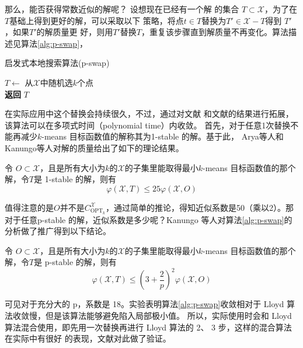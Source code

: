 那么，能否获得常数近似的解呢？ 设想现在已经有一个解
的集合 $T \subset \mathcal{X}$，为了在$T$基础上得到更好的解，可以采取以下
策略，将点$t\in T$替换为$T' \in \mathcal{X}-T$得到 $T'$，如果$T'$的解质量更
好，则用$T'$替换$T$，重复该步骤直到解质量不再变化。算法描
述见算法\ref{alg:p-swap}，
\begin{algorithm}
    \caption{启发式本地搜索算法(p-swap)}\label{alg:p-swap}
    $T \gets $ 从$\mathcal{X}$中随机选$k$个点 \\
    \textbf{返回} $T$
\end{algorithm}
在实际应用中这个替换会持续很久，不过，通过对文献
\cite{arya2004local}和文献\cite{charikar1999improved}的结果进行拓展，该算法可以在多项式时间（polynomial time）内收敛。 首先，对于任意1次替换不能再减少$k$-means 目标函数值的解称其为1-stable 的解。基于此， Arya等人和Kanungo等人对解的质量给出了如下的理论结果。
\begin{theorem}[1-stable的解的质量]
    令 $O \subset \mathcal{X}$，且是所有大小为$k$的$\mathcal{X}$的子集里能取得最小$k$-means 目标函数值的那个解，令$T$是 1-stable 的解，则有
    \begin{equation}
        \varphi(\mathcal{X},T) \leq 25 \varphi(\mathcal{X},O)
    \end{equation}
\end{theorem}
值得注意的是$O$并不是$C_{\text{OPT}_k}^{\mathcal{X}}$，通过简单的推论，得知近似系数是50（乘以2）。那对于任意p-stable 的解，近似系数是多少呢？Kanungo 等人对算法\ref{alg:p-swap}的分析做了推广得到以下结论。
\begin{theorem}[p-stable的解的质量]
    令 $O \subset \mathcal{X}$，且是所有大小为$k$的$\mathcal{X}$的子集里能取得最小$k$-means 目标函数值的那个解，令$T$是 p-stable 的解，则有
    \begin{equation}
        \varphi(\mathcal{X},T) \leq (3+\frac{2}{p})^2 \varphi(\mathcal{X},O)
    \end{equation}
\end{theorem}
可见对于充分大的 p，系数是 18。实验表明算法\ref{alg:p-swap}收敛相对于 Lloyd 算法收敛慢，但是该算法能够避免陷入局部极小值。
所以，实际使用时会和 Lloyd 算法混合使用，即先用一次替换再进行 Lloyd 算法的 2、 3 步，这样的混合算法在实际中有很好
的表现，文献\cite{kanungo2004local}对此做了验证。

